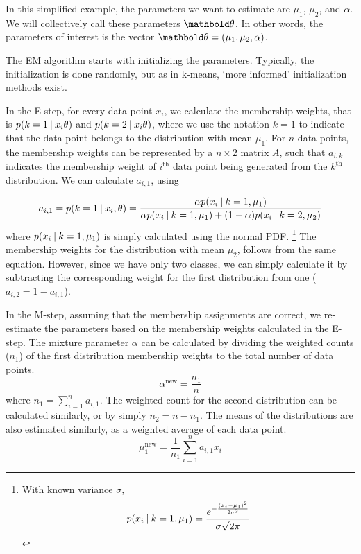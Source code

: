 In this simplified example,
the parameters we want to estimate are $\mu_{1}$, $\mu_{2}$, and $\alpha$.
We will collectively call these parameters $\vect{\theta}$.
In other words, the parameters of interest is the vector
$\vect{\theta} = (\mu_{1}, \mu_{2}, \alpha)$.

The EM algorithm starts with initializing the parameters.
Typically, the initialization is done randomly, 
but as in k-means,
`more informed' initialization methods exist.

In the E-step,
for every data point $x_{i}$,
we calculate the membership weights,
that is $p(k=1\:\vert\: x_{i}\theta)$ and $p(k=2\:\vert\: x_{i}\theta)$,
where we use the notation $k=1$ to indicate
that the data point belongs to the distribution with mean $\mu_{1}$.
For $n$ data points,
the membership weights can be represented by a $n\times{}2$ matrix $A$,
such that $a_{i,k}$ indicates
the membership weight of $i^{\text{th}}$ data point
being generated from the $k^{\text{th}}$ distribution.
We can calculate $a_{i,1}$, using

\[
  a_{i,1} = p(k=1\given x_{i},\theta) =
            \frac{\alpha p(x_{i}\given{}k=1, \mu_{1})}%
              {\alpha p(x_{i}\given{}k=1, \mu_{1}) +
                    (1-\alpha) p(x_{i}\given{}k=2, \mu_{2})}
\]
where $p(x_{i}\:\vert\:{}k=1, \mu_{1})$ is simply calculated using
the normal PDF.%
\footnote{With known variance $\sigma$,
  \[p(x_{i}\given{}k=1, \mu_{1}) = 
    \frac{e^{-\frac{(x_{i}-\mu_{1})^{2}}{2\sigma^{2}}}}%
         {\sigma\sqrt{2\pi}}
  \]
}
The membership weights
for the distribution with mean $\mu_{2}$,
follows from the same equation.
However, since we have only two classes, 
we can simply calculate it by subtracting
the corresponding weight for the first distribution
from one ($a_{i,2} = 1 - a_{i,1}$).

In the M-step,
assuming that the membership assignments are correct,
we re-estimate the parameters based on the membership weights
calculated in the E-step.
The mixture parameter $\alpha$ can be calculated by dividing
the weighted counts ($n_{1}$) of the first distribution membership weights
to the total number of data points.
\[
  \alpha^{\text{new}} = \frac{n_{1}}{n}
\]
where $n_{1} = \sum_{i=1}^{n} a_{i,1}$.
The weighted count for the second distribution can be calculated similarly,
or by simply $n_{2} = n - n_{1}$.
The means of the distributions are also estimated similarly,
as a weighted average of each data point.
\[
  \mu_{1}^{\text{new}} = \frac{1}{n_{1}} \sum_{i=1}^{n} a_{i,1} x_{i}
\]


